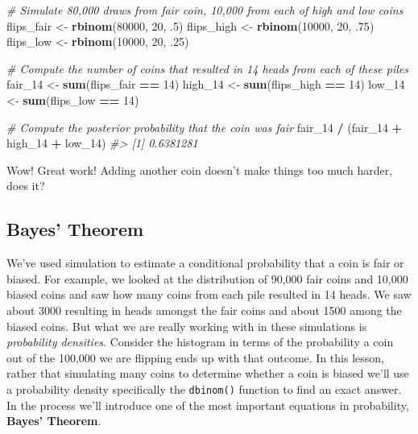 \documentclass[]{article}
\newenvironment{Shaded}{\begin{snugshade}}{\end{snugshade}}
\newcommand{\CommentTok}[1]{\textcolor[rgb]{0.56,0.35,0.01}{\textit{#1}}}
\newcommand{\DecValTok}[1]{\textcolor[rgb]{0.00,0.00,0.81}{#1}}
\newcommand{\FloatTok}[1]{\textcolor[rgb]{0.00,0.00,0.81}{#1}}
\newcommand{\KeywordTok}[1]{\textcolor[rgb]{0.13,0.29,0.53}{\textbf{#1}}}
\newcommand{\NormalTok}[1]{#1}
\newcommand{\OperatorTok}[1]{\textcolor[rgb]{0.81,0.36,0.00}{\textbf{#1}}}
\newcommand{\StringTok}[1]{\textcolor[rgb]{0.31,0.60,0.02}{#1}}
\begin{document}
\begin{Shaded}
\begin{Highlighting}[]
\CommentTok{# Simulate 80,000 draws from fair coin, 10,000 from each of high and low coins}
\NormalTok{flips_fair <-}\StringTok{ }\KeywordTok{rbinom}\NormalTok{(}\DecValTok{80000}\NormalTok{, }\DecValTok{20}\NormalTok{, }\FloatTok{.5}\NormalTok{)}
\NormalTok{flips_high <-}\StringTok{ }\KeywordTok{rbinom}\NormalTok{(}\DecValTok{10000}\NormalTok{, }\DecValTok{20}\NormalTok{, }\FloatTok{.75}\NormalTok{)}
\NormalTok{flips_low <-}\StringTok{ }\KeywordTok{rbinom}\NormalTok{(}\DecValTok{10000}\NormalTok{, }\DecValTok{20}\NormalTok{, }\FloatTok{.25}\NormalTok{)}

\CommentTok{# Compute the number of coins that resulted in 14 heads from each of these piles}
\NormalTok{fair_}\DecValTok{14}\NormalTok{ <-}\StringTok{ }\KeywordTok{sum}\NormalTok{(flips_fair }\OperatorTok{==}\StringTok{ }\DecValTok{14}\NormalTok{)}
\NormalTok{high_}\DecValTok{14}\NormalTok{ <-}\StringTok{ }\KeywordTok{sum}\NormalTok{(flips_high }\OperatorTok{==}\StringTok{ }\DecValTok{14}\NormalTok{)}
\NormalTok{low_}\DecValTok{14}\NormalTok{ <-}\StringTok{ }\KeywordTok{sum}\NormalTok{(flips_low }\OperatorTok{==}\StringTok{ }\DecValTok{14}\NormalTok{)}

\CommentTok{# Compute the posterior probability that the coin was fair}
\NormalTok{fair_}\DecValTok{14} \OperatorTok{/}\StringTok{ }\NormalTok{(fair_}\DecValTok{14} \OperatorTok{+}\StringTok{ }\NormalTok{high_}\DecValTok{14} \OperatorTok{+}\StringTok{ }\NormalTok{low_}\DecValTok{14}\NormalTok{)}
\CommentTok{#> [1] 0.6381281}
\end{Highlighting}
\end{Shaded}

Wow! Great work! Adding another coin doesn't make things too much
harder, does it?

\hypertarget{bayes-theorem}{%
\subsection{Bayes' Theorem}\label{bayes-theorem}}

We've used simulation to estimate a conditional probability that a coin
is fair or biased. For example, we looked at the distribution of 90,000
fair coins and 10,000 biased coins and saw how many coins from each pile
resulted in 14 heads. We saw about 3000 resulting in heads amongst the
fair coins and about 1500 among the biased coins. But what we are really
working with in these simulations is \emph{probability densities}.
Consider the histogram in terms of the probability a coin out of the
100,000 we are flipping ends up with that outcome. In this lesson,
rather that simulating many coins to determine whether a coin is biased
we'll use a probability density specifically the \texttt{dbinom()}
function to find an exact answer. In the process we'll introduce one of
the most important equations in probability, \textbf{Bayes' Theorem}.
\end{document}
